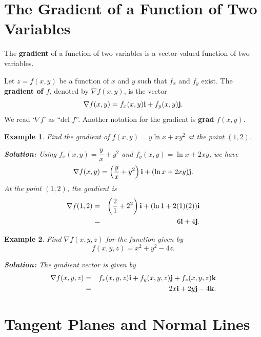 \documentclass[titlepage,a4paper,12pt]{report}
\newtheorem{example}{Example}[section]
\begin{document}
\section{The Gradient of a Function of Two Variables}
The \textbf{gradient} of a function of two variables is a vector-valued function of two variables. 

\noindent Let $z=f(x,y)$ be a function of $x$ and $y$ such that $f_x$ and $f_y$ exist. The \textbf{gradient of $f$}, denoted by $\nabla f(x,y)$, is the vector 
\[\nabla f(x,y)=f_x(x,y){\bf{i}}+f_y(x,y){\bf{j}}.\]
We read `$\nabla f$' as ``del $f$''. Another notation for the gradient is \textbf{grad} $f(x,y)$.
\begin{example}
Find the gradient of $f(x,y)=y\ln x +xy^2$ at the point $(1,2)$.

\noindent \textbf{Solution:} Using $f_x(x,y)=\dfrac{y}{x}+y^2$ and $f_y(x,y)=\ln x +2xy$, we have
\[\nabla f(x,y)=\left(\dfrac{y}{x}+y^2\right){\bf{i}}+(\ln x +2xy){\bf{j}}.\]
At the point $(1,2)$, the gradient is 
\begin{eqnarray*}
\nabla f(1,2) &=& \left(\dfrac{2}{1}+2^2\right){\bf{i}}+(\ln 1 +2(1)(2)){\bf{i}}\\
&=&6{\bf{i}}+4{\bf{j}}.
\end{eqnarray*}
\end{example}
\begin{example}
Find $\nabla f(x,y,z)$ for the function given by 
\[f(x,y,z)=x^2+y^2-4z.\]

\noindent \textbf{Solution:} The gradient vector is given by 
\begin{eqnarray*}
\nabla f(x,y,z) &=& f_x(x,y,z){\bf{i}}+f_y(x,y,z){\bf{j}}+f_z(x,y,z){\bf{k}}\\
&=& 2x{\bf{i}}+2y{\bf{j}}-4{\bf{k}}.
\end{eqnarray*}
\end{example}
\section{Tangent Planes and Normal Lines}
\end{document}
